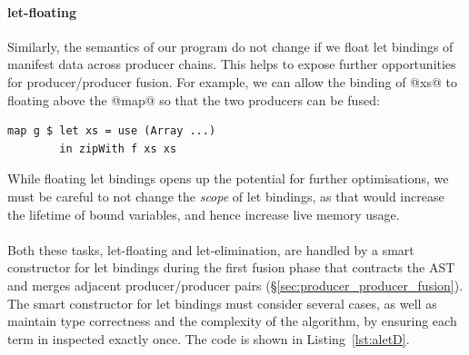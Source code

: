 \paragraph{let-floating}

Similarly, the semantics of our program do not change if we float let bindings
of manifest data across producer chains. This helps to expose further
opportunities for producer/producer fusion. For example, we can allow the
binding of @xs@ to floating above the @map@ so that the two producers can be
fused:
%
\begin{lstlisting}[style=haskell]
map g $ let xs = use (Array ...)
        in zipWith f xs xs
\end{lstlisting}
%
While floating let bindings opens up the potential for further optimisations, we
must be careful to not change the \emph{scope} of let bindings, as that would
increase the lifetime of bound variables, and hence increase live memory usage.


\paragraph{}

Both these tasks, let-floating and let-elimination, are handled by a smart
constructor for let bindings during the first fusion phase that contracts the
AST and merges adjacent producer/producer pairs
(\S\ref{sec:producer_producer_fusion}). The smart constructor for let bindings
must consider several cases, as well as maintain type correctness and the
complexity of the algorithm, by ensuring each term in inspected exactly once.
The code is shown in Listing~\ref{lst:aletD}.

